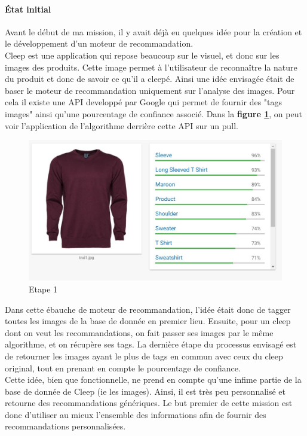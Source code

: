 \documentclass{article} %
\begin{document}
\paragraph{État initial}
Avant le début de ma mission, il y avait déjà eu quelques idée pour la création et le développement d'un moteur de recommandation.\\
Cleep est une application qui repose beaucoup sur le visuel, et donc sur les images des produits. Cette image permet à l'utilisateur de reconnaître la nature du produit et donc de savoir ce qu'il a cleepé. Ainsi une idée envisagée était de baser le moteur de recommandation uniquement sur l'analyse des images. Pour cela il existe une API developpé par Google qui permet de fournir des "tags images" ainsi qu'une pourcentage de confiance associé. Dans la \textbf{figure \ref{fig:ggviz}}, on peut voir l'application de l'algorithme derrière cette API sur un pull.\\

\begin{figure}[!h]
	\centering
	\includegraphics[keepaspectratio = true,scale=0.4]{ggvision.jpg}
	\caption{Etape 1}
	\label{fig:ggviz}
\end{figure}

Dans cette ébauche de moteur de recommandation, l'idée était donc de tagger toutes les images de la base de donnée en premier lieu. Ensuite, pour un cleep dont on veut les recommandations, on fait passer ses images par le même algorithme, et on récupère ses tags. La dernière étape du processus envisagé est de retourner les images ayant le plus de tags en commun avec ceux du cleep original, tout en prenant en compte le pourcentage de confiance.\\
Cette idée, bien que fonctionnelle, ne prend en compte qu'une infime partie de la base de donnée de Cleep (ie les images). Ainsi, il est très peu personnalisé et retourne des recommandations génériques. Le but premier de cette mission est donc d'utiliser au mieux l'ensemble des informations afin de fournir des recommandations personnalisées.
\end{document}
